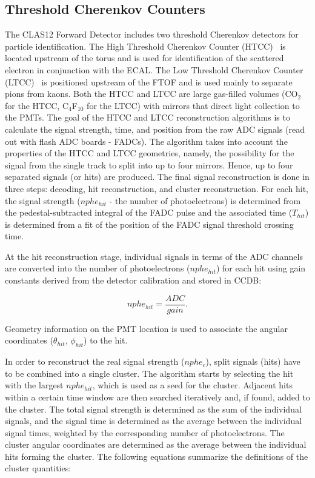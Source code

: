 \subsection{Threshold Cherenkov Counters}

The CLAS12 Forward Detector includes two threshold Cherenkov detectors for particle identification. The
High Threshold Cherenkov Counter (HTCC)~\cite{htcc-nim} is located upstream of the torus and is used for
identification of the scattered electron in conjunction with the ECAL. The Low Threshold Cherenkov Counter
(LTCC)~\cite{ltcc-nim} is positioned upstream of the FTOF and is used mainly to separate pions from kaons.
Both the HTCC and LTCC are large gas-filled volumes (CO$_2$ for the HTCC, C$_4$F$_{10}$ for the LTCC)
with mirrors that direct light collection to the PMTs. The goal of the HTCC and LTCC reconstruction algorithms
is to calculate the signal strength, time, and position from the raw ADC signals (read out with flash ADC boards
- FADCs). The algorithm takes into account the properties of the HTCC and LTCC geometries, namely, the
possibility for the signal from the single track to split into up to four mirrors. Hence, up to four separated
signals (or hits) are produced. The final signal reconstruction is done in three steps: decoding, hit reconstruction,
and cluster reconstruction. For each hit, the signal strength ($nphe_{hit}$ - the number of photoelectrons) is
determined from the pedestal-subtracted integral of the FADC pulse and the associated time ($T_{hit}$) is
determined from a fit of the position of the FADC signal threshold crossing time.

At the hit reconstruction stage, individual signals in terms of the ADC channels are converted into the number of
photoelectrons ($nphe_{hit}$) for each hit using gain constants derived from the detector calibration and stored
in CCDB:

\begin{equation}
nphe_{hit} = \frac{ADC}{gain}.
\end{equation}

\noindent
Geometry information on the PMT location is used to associate the angular coordinates ($\theta_{hit}$, $\phi_{hit}$)
to the hit.

In order to reconstruct the real signal strength ($nphe_c$), split signals (hits) have to be combined into a single
cluster. The algorithm starts by selecting the hit with the largest $nphe_{hit}$, which is used as a seed for the
cluster. Adjacent hits within a certain time window are then searched iteratively and, if found, added to the
cluster. The total signal strength is determined as the sum of the individual signals, and the signal time is
determined as the average between the individual signal times, weighted by the corresponding number of
photoelectrons. The cluster angular coordinates are determined as the average between the individual hits forming
the cluster. The following equations summarize the definitions of the cluster quantities:

